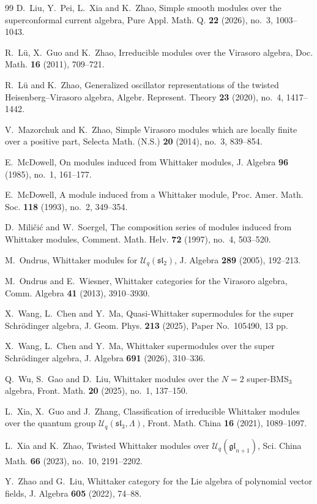 \documentclass[12pt,reqno]{article}
\def\F{\mathfrak}
\def\C{\mathcal}
\begin{document}
\begin{thebibliography}{99}
D.~Liu, Y.~Pei, L.~Xia and K.~Zhao, Simple smooth modules over the superconformal current algebra, Pure Appl. Math. Q. {\bf 22} (2026), no.~3, 1003--1043.

 R.~L\"u, X.~Guo and K.~Zhao, Irreducible modules over the Virasoro algebra, Doc. Math. {\bf 16} (2011), 709--721.

 R.~L\"u and K.~Zhao, Generalized oscillator representations of the twisted Heisenberg--Virasoro algebra, Algebr. Represent. Theory {\bf 23} (2020), no.~4, 1417--1442.

 V.~Mazorchuk and K.~Zhao, Simple Virasoro modules which are locally finite over a positive part, Selecta Math. (N.S.) {\bf 20} (2014), no.~3, 839--854.

 E.~McDowell, On modules induced from Whittaker modules, J. Algebra {\bf 96} (1985), no.~1, 161--177.

 E.~McDowell, A module induced from a Whittaker module, Proc. Amer. Math. Soc. {\bf 118} (1993), no.~2, 349--354.

D.~Mili\v{c}i\'c and W.~Soergel, The composition series of modules induced from Whittaker modules, Comment. Math. Helv. {\bf 72} (1997), no.~4, 503--520.

 M.~Ondrus, Whittaker modules for $\C{U}_q(\F{sl}_2)$, J. Algebra {\bf 289} (2005), 192--213.

 M.~Ondrus and E.~Wiesner, Whittaker categories for the Virasoro algebra, Comm. Algebra {\bf 41} (2013), 3910--3930.

 X.~Wang, L.~Chen and Y.~Ma, Quasi-Whittaker supermodules for the super Schr\"odinger algebra, J. Geom. Phys. {\bf 213} (2025), Paper No.~105490, 13 pp.

 X.~Wang, L.~Chen and Y.~Ma, Whittaker supermodules over the super Schr\"odinger algebra, J. Algebra {\bf 691} (2026), 310--336.

 Q.~Wu, S.~Gao and D.~Liu, Whittaker modules over the $N=2$ super-BMS$_3$ algebra, Front. Math. {\bf 20} (2025), no.~1, 137--150.

 L.~Xia, X.~Guo and J.~Zhang, Classification of irreducible Whittaker modules over the quantum group $\C{U}_q(\F{sl}_3,\Lambda)$, Front. Math. China {\bf 16} (2021), 1089--1097.

 L.~Xia and K.~Zhao, Twisted Whittaker modules over $\C{U}_q(\F{gl}_{n+1})$, Sci. China Math. {\bf 66} (2023), no.~10, 2191--2202.

 Y.~Zhao and G.~Liu, Whittaker category for the Lie algebra of polynomial vector fields, J. Algebra {\bf 605} (2022), 74--88.
	\end{thebibliography}
	
\end{document}
